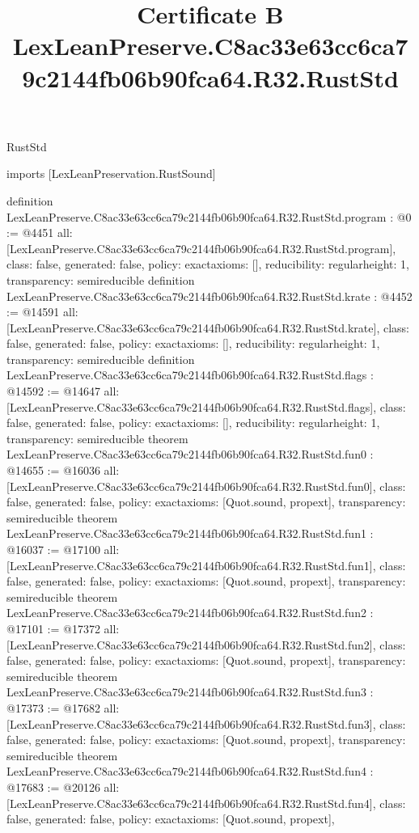 \begin{lexlean}{RustStd}
\title{Certificate B LexLeanPreserve.C8ac33e63cc6ca79c2144fb06b90fca64.R32.RustStd}
\begin{coremodule}
imports [LexLeanPreservation.RustSound]

definition LexLeanPreserve.C8ac33e63cc6ca79c2144fb06b90fca64.R32.RustStd.program : @0 := @4451 {
  all: [LexLeanPreserve.C8ac33e63cc6ca79c2144fb06b90fca64.R32.RustStd.program],
  class: false,
  generated: false,
  policy: exact{axioms: []},
  reducibility: regular{height: 1},
  transparency: semireducible
}
definition LexLeanPreserve.C8ac33e63cc6ca79c2144fb06b90fca64.R32.RustStd.krate : @4452 := @14591 {
  all: [LexLeanPreserve.C8ac33e63cc6ca79c2144fb06b90fca64.R32.RustStd.krate],
  class: false,
  generated: false,
  policy: exact{axioms: []},
  reducibility: regular{height: 1},
  transparency: semireducible
}
definition LexLeanPreserve.C8ac33e63cc6ca79c2144fb06b90fca64.R32.RustStd.flags : @14592 := @14647 {
  all: [LexLeanPreserve.C8ac33e63cc6ca79c2144fb06b90fca64.R32.RustStd.flags],
  class: false,
  generated: false,
  policy: exact{axioms: []},
  reducibility: regular{height: 1},
  transparency: semireducible
}
theorem LexLeanPreserve.C8ac33e63cc6ca79c2144fb06b90fca64.R32.RustStd.fun0 : @14655 := @16036 {
  all: [LexLeanPreserve.C8ac33e63cc6ca79c2144fb06b90fca64.R32.RustStd.fun0],
  class: false,
  generated: false,
  policy: exact{axioms: [Quot.sound, propext]},
  transparency: semireducible
}
theorem LexLeanPreserve.C8ac33e63cc6ca79c2144fb06b90fca64.R32.RustStd.fun1 : @16037 := @17100 {
  all: [LexLeanPreserve.C8ac33e63cc6ca79c2144fb06b90fca64.R32.RustStd.fun1],
  class: false,
  generated: false,
  policy: exact{axioms: [Quot.sound, propext]},
  transparency: semireducible
}
theorem LexLeanPreserve.C8ac33e63cc6ca79c2144fb06b90fca64.R32.RustStd.fun2 : @17101 := @17372 {
  all: [LexLeanPreserve.C8ac33e63cc6ca79c2144fb06b90fca64.R32.RustStd.fun2],
  class: false,
  generated: false,
  policy: exact{axioms: [Quot.sound, propext]},
  transparency: semireducible
}
theorem LexLeanPreserve.C8ac33e63cc6ca79c2144fb06b90fca64.R32.RustStd.fun3 : @17373 := @17682 {
  all: [LexLeanPreserve.C8ac33e63cc6ca79c2144fb06b90fca64.R32.RustStd.fun3],
  class: false,
  generated: false,
  policy: exact{axioms: [Quot.sound, propext]},
  transparency: semireducible
}
theorem LexLeanPreserve.C8ac33e63cc6ca79c2144fb06b90fca64.R32.RustStd.fun4 : @17683 := @20126 {
  all: [LexLeanPreserve.C8ac33e63cc6ca79c2144fb06b90fca64.R32.RustStd.fun4],
  class: false,
  generated: false,
  policy: exact{axioms: [Quot.sound, propext]},
}
\end{coremodule}
\end{lexlean}
